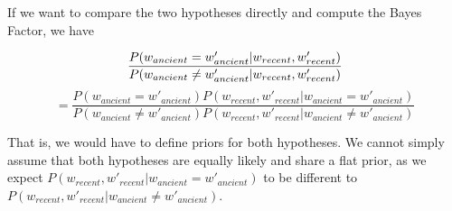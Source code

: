 \documentclass[8pt]{article}
\begin{document}
If we want to compare the two hypotheses directly and compute the Bayes Factor, we have

\begin{equation}
\frac{P(w_{ancient}=w'_{ancient}|w_{recent},w'_{recent})}{P(w_{ancient}\neq w'_{ancient}|w_{recent},w'_{recent})} \\
\end{equation}
\begin{equation}
= \frac{P(w_{ancient}=w'_{ancient})P(w_{recent},w'_{recent}|w_{ancient}=w'_{ancient})}{P(w_{ancient}\neq w'_{ancient})P(w_{recent},w'_{recent}|w_{ancient}\neq w'_{ancient})}
\end{equation}

That is, we would have to define priors for both hypotheses. We cannot simply assume that both hypotheses are equally likely and share a flat prior, as we expect $P(w_{recent},w'_{recent}|w_{ancient}=w'_{ancient}) $ to be different to $ P(w_{recent},w'_{recent}|w_{ancient}\neq w'_{ancient})$.







\end{document}
